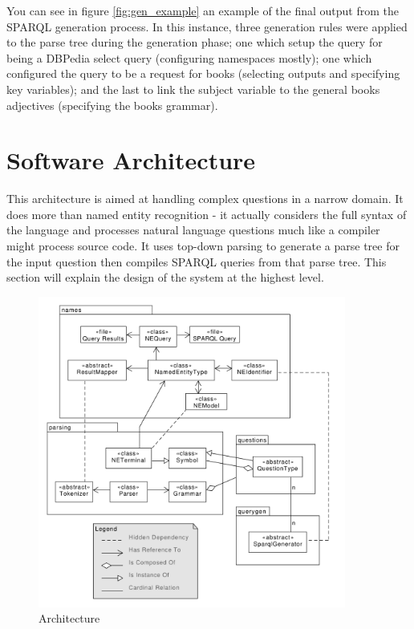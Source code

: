 \documentclass[11pt]{article}
\begin{document}
You can see in figure \ref{fig:gen_example} an example of the final output from the
SPARQL generation process. In this instance, three generation rules were applied to
the parse tree during the generation phase; one which setup the query for being
a DBPedia select query (configuring namespaces mostly); one which configured
the query to be a request for books (selecting outputs and specifying key variables);
and the last to link the subject variable to the general books adjectives (specifying
the books grammar). 

\clearpage

\section{Software Architecture}

This architecture is aimed at handling complex questions in a narrow domain.
It does more than named entity recognition - it actually considers
the full syntax of the language and processes natural language questions
much like a compiler might process source code. It uses
top-down parsing to generate a parse tree for the input question then
compiles SPARQL queries from that parse tree.
This section will explain the design of the system at the highest level.

\begin{figure}[h!]
    \centering
    \includegraphics[width=0.9\textwidth,natwidth=1,natheight=1]{umlet/architecture.pdf}
    \caption{Architecture}
    \label{fig:arch}
\end{figure}
\end{document}
